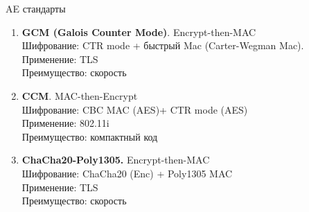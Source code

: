 \documentclass[usenames,dvipsnames,8pt,aspectratio=169]{beamer}
\begin{document}
\begin{frame}{AE стандарты}
	\LARGE
	\begin{enumerate}
		 pt
		\item \textbf{GCM (Galois Counter Mode)}. {\Large {\color{Orange}Encrypt-then-MAC}  \\
			Шифрование: CTR mode + быстрый Mac (Carter-Wegman Mac).  \\
			Применение: TLS \\
			Преимущество: скорость
		}
		\pause
		\item \textbf{CCM}.  {\Large {\color{Orange}MAC-then-Encrypt}  \\
			Шифрование: CBC MAC (AES)+ CTR mode (AES)  \\
			Применение: 802.11i \\
			Преимущество: компактный код
		}
		\pause
		\item \textbf{ChaCha20-Poly1305.} {\Large {\color{Orange} Encrypt-then-MAC}  \\
			Шифрование: ChaCha20 (Enc) + Poly1305 MAC \\
			Применение: TLS \\
			Преимущество: скорость
		}
	\end{enumerate}
\end{frame}
\end{document}
